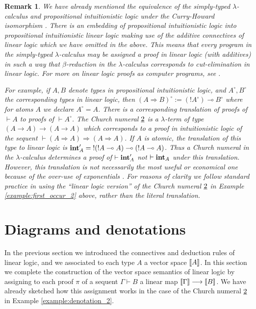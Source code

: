 \documentclass[english,letter paper,12pt,reqno]{article}
\theoremstyle{example}
\newtheorem{remark}[theorem]{Remark}
\numberwithin{equation}{section}
\def\inta{\bold{int}}
\begin{document}
\begin{remark}\label{remark:embedding_intuit} We have already mentioned the equivalence of the simply-typed $\lambda$-calculus and propositional intuitionistic logic under the Curry-Howard isomorphism \cite[\S 6.5]{selinger}. There is an embedding of propositional intuitionistic logic into propositional intuitionistic \emph{linear} logic \cite[\S 5.1]{girard_llogic} making use of the additive connectives of linear logic which we have omitted in the above. This means that every program in the simply-typed $\lambda$-calculus may be assigned a proof in linear logic (with additives) in such a way that $\beta$-reduction in the $\lambda$-calculus corresponds to cut-elimination in linear logic. For more on linear logic proofs as computer programs, see \cite{lafont,abramsky,benton_etal}.

For example, if $A,B$ denote types in propositional intuitionistic logic, and $A^\circ, B^\circ$ the corresponding types in linear logic, then $(A \Rightarrow B)^\circ := (! A^\circ) \multimap B^\circ$ where for atoms $A$ we declare $A^\circ = A$. There is a corresponding translation of proofs of $\vdash A$ to proofs of $\vdash A^\circ$. The Church numeral $\underline{2}$ is a $\lambda$-term of type $(A \rightarrow A) \rightarrow (A \rightarrow A)$ which corresponds to a proof in intuitionistic logic of the sequent $\vdash (A \Rightarrow A) \Rightarrow (A \Rightarrow A)$. If $A$ is atomic, the translation of this type to linear logic is $\inta_A' = {!}( {!}A \multimap A ) \multimap ({!}A \multimap A)$. Thus a Church numeral in the $\lambda$-calculus determines a proof of $\vdash \inta_A'$ not $\vdash \inta_A$ under this translation. However, this translation is not necessarily the most useful or economical one because of the over-use of exponentials \cite[\S 5.3]{girard_llogic}. For reasons of clarity we follow standard practice in using the ``linear logic version'' of the Church numeral $\underline{2}$ in Example \ref{example:first_occur_2} above, rather than the literal translation.
\end{remark}

\section{Diagrams and denotations}\label{section:diagrammatics}

In the previous section we introduced the connectives and deduction rules of linear logic, and we associated to each type $A$ a vector space $\llbracket A \rrbracket$. In this section we complete the construction of the vector space semantics of linear logic by assigning to each proof $\pi$ of a sequent $\Gamma \vdash B$ a linear map $\llbracket \Gamma \rrbracket \longrightarrow \llbracket B \rrbracket$. We have already sketched how this assignment works in the case of the Church numeral $\underline{2}$ in Example \ref{example:denotation_2}.
\end{document}
